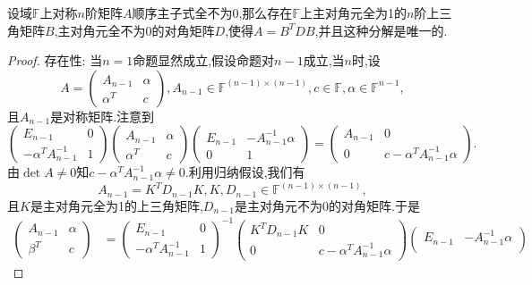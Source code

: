 \documentclass[../../main.tex]{subfiles}
\begin{document}
\begin{theorem}\label{theorem:定理23......4654}
设域\( \mathbb{F} \)上对称\( n \)阶矩阵\( A \)顺序主子式全不为0,那么存在\( \mathbb{F} \)上主对角元全为1的\( n \)阶上三角矩阵\( B \),主对角元全不为0的对角矩阵\( D \),使得\( A = B^T D B \),并且这种分解是唯一的.
\end{theorem}
\begin{proof}
{\heiti 存在性:} 当\( n = 1 \)命题显然成立,假设命题对\( n - 1 \)成立,当\( n \)时,设
\[
A = \begin{pmatrix}
A_{n - 1} & \alpha \\
\alpha^T & c
\end{pmatrix}, A_{n - 1} \in \mathbb{F}^{(n - 1) \times (n - 1)}, c \in \mathbb{F}, \alpha \in \mathbb{F}^{n - 1},
\]
且\( A_{n - 1} \)是对称矩阵.注意到
\[
\begin{pmatrix}
E_{n - 1} & 0 \\
-\alpha^T A_{n - 1}^{-1} & 1
\end{pmatrix} \begin{pmatrix}
A_{n - 1} & \alpha \\
\alpha^T & c
\end{pmatrix} \begin{pmatrix}
E_{n - 1} & -A_{n - 1}^{-1} \alpha \\
0 & 1
\end{pmatrix} = \begin{pmatrix}
A_{n - 1} & 0 \\
0 & c - \alpha^T A_{n - 1}^{-1} \alpha
\end{pmatrix}.
\]
由\( \det A \neq 0 \)知\( c - \alpha^T A_{n - 1}^{-1} \alpha \neq 0 \).利用归纳假设,我们有
\[
A_{n - 1} = K^T D_{n - 1} K, K, D_{n - 1} \in \mathbb{F}^{(n - 1) \times (n - 1)},
\]
且\( K \)是主对角元全为1的上三角矩阵,\( D_{n - 1} \)是主对角元不为0的对角矩阵.于是
\[
\begin{aligned}
\begin{pmatrix}
A_{n - 1} & \alpha \\
\beta^T & c
\end{pmatrix} &= \begin{pmatrix}
E_{n - 1} & 0 \\
-\alpha^T A_{n - 1}^{-1} & 1
\end{pmatrix}^{-1} \begin{pmatrix}
K^T D_{n - 1} K & 0 \\
0 & c - \alpha^T A_{n - 1}^{-1} \alpha
\end{pmatrix} \begin{pmatrix}
E_{n - 1} & -A_{n - 1}^{-1} \alpha \\

\end{pmatrix}
\end{aligned}\]
\end{proof}
\end{document}
